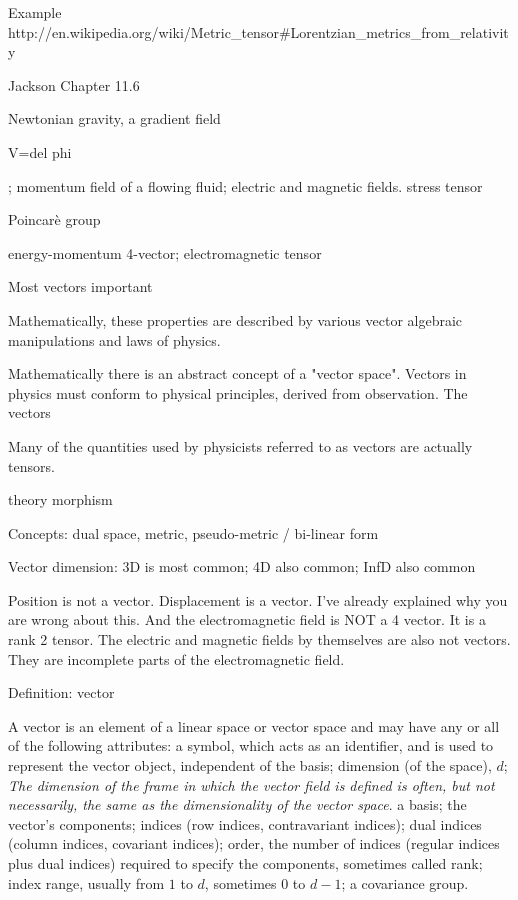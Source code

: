 \documentclass{llncs}
\begin{document}
Example
http://en.wikipedia.org/wiki/Metric\_tensor\#Lorentzian\_metrics\_from\_relativity

Jackson Chapter 11.6


Newtonian gravity, a gradient field

V=del phi

;  momentum field of a flowing fluid; electric and magnetic fields.
stress tensor



Poincar\`{e} group

energy-momentum 4-vector; electromagnetic tensor


Most vectors important

Mathematically, these properties are described by various vector
algebraic manipulations and laws of physics.

Mathematically there is an abstract concept of a "vector
space". Vectors in physics must conform to physical principles,
derived from observation.
The vectors 

Many of the quantities used by physicists referred to as vectors are
actually tensors.

theory morphism

Concepts: dual space, metric, pseudo-metric / bi-linear form


Vector dimension:
3D is most common; 4D also common; InfD also common

 
Position is not a vector. Displacement is a vector. I've already explained why
you are wrong about this. And the electromagnetic field is NOT a 4 vector. It
is a rank 2 tensor. The electric and magnetic fields by themselves are also not
vectors. They are incomplete parts of the electromagnetic field.


Definition: vector

A vector is an element of a linear space or vector space and may have
any or all of the following attributes:
a symbol, which acts as an identifier, and is used to represent the
vector object, independent of the basis;
dimension (of the space), $d$;
{\em The dimension of the frame in which the vector field is defined
is often, but not necessarily, the same as the dimensionality of the
vector space}.
a basis;
the vector's components;
indices (row indices, contravariant indices);
dual indices (column indices, covariant indices);
order, the number of indices (regular indices plus dual indices)
required to specify the components, sometimes called rank;
index range, usually from $1$ to $d$, sometimes $0$ to $d - 1$;
a covariance group.
\end{document}

